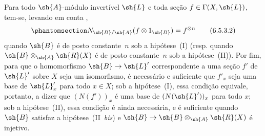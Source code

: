 \documentclass[oneside,10pt]{amsart}
\makeatletter
\newcommand{\ega@arrow}[2]{\mathchoice{#1}{#2}{#2}{#2}}
\renewcommand{\to}{\ega@arrow{\longrightarrow}{\rightarrow}}
\let\EGAOriginalLabel\label
\renewcommand{\label}[1]{\phantomsection\EGAOriginalLabel{#1}}
\makeatother
\begin{document}
\begin{env}[6.5.3]
Para todo $\sh{A}$-módulo invertível $\sh{L}$ e toda seção $f\in\Gamma(X,\sh{L})$, tem-se, levando em conta ,
\[
\label{II.6.5.3.2}
  N_{\sh{B}/\sh{A}}(f\otimes 1_{\sh{B}}) = f^{\otimes n}
\tag{6.5.3.2}
\]
quando $\sh{B}$ é de posto constante~$n$ sob a hipótese~(I) (resp. quando $\sh{B}\otimes_{\sh{A}}\sh{R}(X)$ é de posto constante~$n$ sob a hipótese~(II)).
Por fim, para que o homomorfismo $\sh{B}\to\sh{L}'$ correspondente a uma seção $f'$ de $\sh{L}'$ sobre $X$ seja um isomorfismo, é necessário e suficiente que $f'_x$ seja uma base de $\sh{L}'_x$ para todo $x\in X$;
sob a hipótese~(I), essa condição equivale, portanto, a dizer que $(N(f'))_x$ é uma base de $(N(\sh{L}'))_x$ para todo $x$;
sob a hipótese~(II), essa condição é ainda necessária, e é suficiente quando $\sh{B}$ satisfaz a hipótese~(II~\emph{bis}) e $\sh{B}\to\sh{B}\otimes_{\sh{A}}\sh{R}(X)$ é injetivo.
\end{env}
\end{document}
